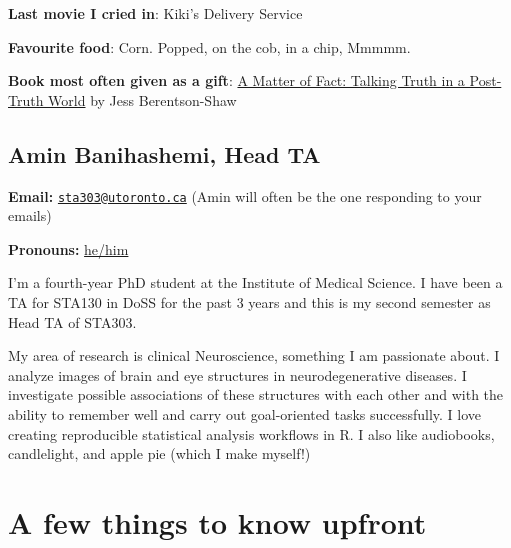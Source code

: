 \documentclass[
  openany]{book}
\begin{document}
\textbf{Last movie I cried in}: Kiki's Delivery Service

\textbf{Favourite food}: Corn. Popped, on the cob, in a chip, Mmmmm.

\textbf{Book most often given as a gift}: \href{https://www.goodreads.com/book/show/41123067-a-matter-of-fact}{A Matter of Fact: Talking Truth in a Post-Truth World} by Jess Berentson-Shaw

\hypertarget{amin-banihashemi-head-ta}{%
\subsection{Amin Banihashemi, Head TA}\label{amin-banihashemi-head-ta}}

\textbf{Email:} \href{mailto:sta303@utoronto.ca}{\nolinkurl{sta303@utoronto.ca}} (Amin will often be the one responding to your emails)

\textbf{Pronouns:} \href{https://www.mypronouns.org/he-him}{he/him}

I'm a fourth-year PhD student at the Institute of Medical Science. I have been a TA for STA130 in DoSS for the past 3 years and this is my second semester as Head TA of STA303.

My area of research is clinical Neuroscience, something I am passionate about. I analyze images of brain and eye structures in neurodegenerative diseases. I investigate possible associations of these structures with each other and with the ability to remember well and carry out goal-oriented tasks successfully. I love creating reproducible statistical analysis workflows in R. I also like audiobooks, candlelight, and apple pie (which I make myself!)

\hypertarget{a-few-things-to-know-upfront}{%
\section{A few things to know upfront}\label{a-few-things-to-know-upfront}}
\end{document}
